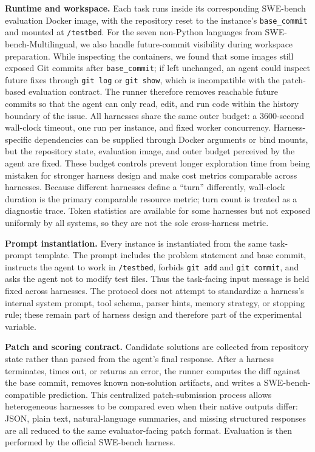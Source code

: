\documentclass{llmxive}
\begin{document}
\textbf{Runtime and workspace.}
Each task runs inside its corresponding SWE-bench evaluation Docker image, with the repository reset to the instance's \texttt{base\_commit} and mounted at \texttt{/testbed}. For the seven non-Python languages from SWE-bench-Multilingual, we also handle future-commit visibility during workspace preparation. While inspecting the containers, we found that some images still exposed Git commits after \texttt{base\_commit}; if left unchanged, an agent could inspect future fixes through \texttt{git log} or \texttt{git show}, which is incompatible with the patch-based evaluation contract. The runner therefore removes reachable future commits so that the agent can only read, edit, and run code within the history boundary of the issue. All harnesses share the same outer budget: a 3600-second wall-clock timeout, one run per instance, and fixed worker concurrency. Harness-specific dependencies can be supplied through Docker arguments or bind mounts, but the repository state, evaluation image, and outer budget perceived by the agent are fixed. These budget controls prevent longer exploration time from being mistaken for stronger harness design and make cost metrics comparable across harnesses. Because different harnesses define a ``turn'' differently, wall-clock duration is the primary comparable resource metric; turn count is treated as a diagnostic trace. Token statistics are available for some harnesses but not exposed uniformly by all systems, so they are not the sole cross-harness metric.

\textbf{Prompt instantiation.}
Every instance is instantiated from the same task-prompt template. The prompt includes the problem statement and base commit, instructs the agent to work in \texttt{/testbed}, forbids \texttt{git add} and \texttt{git commit}, and asks the agent not to modify test files. Thus the task-facing input message is held fixed across harnesses. The protocol does not attempt to standardize a harness's internal system prompt, tool schema, parser hints, memory strategy, or stopping rule; these remain part of harness design and therefore part of the experimental variable.

\textbf{Patch and scoring contract.}
Candidate solutions are collected from repository state rather than parsed from the agent's final response. After a harness terminates, times out, or returns an error, the runner computes the diff against the base commit, removes known non-solution artifacts, and writes a SWE-bench-compatible prediction. This centralized patch-submission process allows heterogeneous harnesses to be compared even when their native outputs differ: JSON, plain text, natural-language summaries, and missing structured responses are all reduced to the same evaluator-facing patch format. Evaluation is then performed by the official SWE-bench harness.
\end{document}
